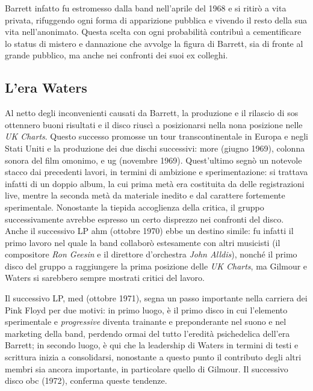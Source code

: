 \documentclass[class=book, crop=false, oneside, 12pt]{standalone}
\begin{document}
    Barrett infatto fu estromesso dalla band nell'aprile del 1968 e si ritirò a vita privata, rifuggendo ogni forma di apparizione pubblica e vivendo il resto della sua vita nell'anonimato. Questa scelta con ogni probabilità contribuì a cementificare lo status di mistero e dannazione che avvolge la figura di Barrett, sia di fronte al grande pubblico, ma anche nei confronti dei suoi ex colleghi.
    
    
    \subsection{L'era Waters}
    Al netto degli inconvenienti causati da Barrett, la produzione e il rilascio di \acrshort{sos} ottennero buoni risultati e il disco riuscì a posizionarsi nella nona posizione nelle \emph{UK Charts}. Questo successo promosse un tour transcontinentale in Europa e negli Stati Uniti e la produzione dei due dischi successivi: \acrlong{more} (giugno 1969), colonna sonora del film omonimo, e \acrlong{ug} (novembre 1969). Quest'ultimo segnò un notevole stacco dai precedenti lavori, in termini di ambizione e sperimentazione: si trattava infatti di un doppio album, la cui prima metà era costituita da delle registrazioni live, mentre la seconda metà da materiale inedito e dal carattere fortemente sperimentale. Nonostante la tiepida accoglienza della critica, il gruppo successivamente avrebbe espresso un certo disprezzo nei confronti del disco. Anche il successivo LP  \acrfull{ahm} (ottobre 1970) ebbe un destino simile: fu infatti il primo lavoro nel quale la band collaborò estesamente con altri musicisti (il compositore \emph{Ron Geesin} e il direttore d'orchestra \emph{John Alldis}), nonché il primo disco del gruppo a raggiungere la prima posizione delle \emph{UK Charts}, ma Gilmour e Waters si sarebbero sempre mostrati critici del lavoro.


    Il successivo LP, \acrlong{med} (ottobre 1971), segna un passo importante nella carriera dei Pink Floyd per due motivi: in primo luogo, è il primo disco in cui l'elemento sperimentale e \emph{progressive} diventa trainante e preponderante nel suono e nel marketing della band, perdendo ormai del tutto l'eredità psichedelica dell'era Barrett; in secondo luogo, è qui che la leadership di Waters in termini di testi e scrittura inizia a consolidarsi, nonostante a questo punto il contributo degli altri membri sia ancora importante, in particolare quello di Gilmour. Il successivo disco \acrfull{obc} (1972), conferma queste tendenze.
\end{document}
